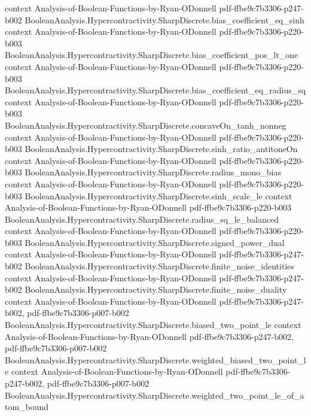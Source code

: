 \begin{theorem}
  {context}
  {Analysis-of-Boolean-Functions-by-Ryan-ODonnell}
  {pdf-ffbe9c7b3306-p247-b002}
\proofstep
  {BooleanAnalysis.Hypercontractivity.SharpDiscrete.bias_coefficient_eq_sinh}
  {context}
  {Analysis-of-Boolean-Functions-by-Ryan-ODonnell}
  {pdf-ffbe9c7b3306-p220-b003}
\proofstep
  {BooleanAnalysis.Hypercontractivity.SharpDiscrete.bias_coefficient_pos_lt_one}
  {context}
  {Analysis-of-Boolean-Functions-by-Ryan-ODonnell}
  {pdf-ffbe9c7b3306-p220-b003}
\proofstep
  {BooleanAnalysis.Hypercontractivity.SharpDiscrete.bias_coefficient_eq_radius_sq}
  {context}
  {Analysis-of-Boolean-Functions-by-Ryan-ODonnell}
  {pdf-ffbe9c7b3306-p220-b003}
\proofstep
  {BooleanAnalysis.Hypercontractivity.SharpDiscrete.concaveOn_tanh_nonneg}
  {context}
  {Analysis-of-Boolean-Functions-by-Ryan-ODonnell}
  {pdf-ffbe9c7b3306-p220-b003}
\proofstep
  {BooleanAnalysis.Hypercontractivity.SharpDiscrete.sinh_ratio_antitoneOn}
  {context}
  {Analysis-of-Boolean-Functions-by-Ryan-ODonnell}
  {pdf-ffbe9c7b3306-p220-b003}
\proofstep
  {BooleanAnalysis.Hypercontractivity.SharpDiscrete.radius_mono_bias}
  {context}
  {Analysis-of-Boolean-Functions-by-Ryan-ODonnell}
  {pdf-ffbe9c7b3306-p220-b003}
\proofstep
  {BooleanAnalysis.Hypercontractivity.SharpDiscrete.sinh_scale_le}
  {context}
  {Analysis-of-Boolean-Functions-by-Ryan-ODonnell}
  {pdf-ffbe9c7b3306-p220-b003}
\proofstep
  {BooleanAnalysis.Hypercontractivity.SharpDiscrete.radius_sq_le_balanced}
  {context}
  {Analysis-of-Boolean-Functions-by-Ryan-ODonnell}
  {pdf-ffbe9c7b3306-p220-b003}
\proofstep
  {BooleanAnalysis.Hypercontractivity.SharpDiscrete.signed_power_dual}
  {context}
  {Analysis-of-Boolean-Functions-by-Ryan-ODonnell}
  {pdf-ffbe9c7b3306-p247-b002}
\proofstep
  {BooleanAnalysis.Hypercontractivity.SharpDiscrete.finite_noise_identities}
  {context}
  {Analysis-of-Boolean-Functions-by-Ryan-ODonnell}
  {pdf-ffbe9c7b3306-p247-b002}
\proofstep
  {BooleanAnalysis.Hypercontractivity.SharpDiscrete.finite_noise_duality}
  {context}
  {Analysis-of-Boolean-Functions-by-Ryan-ODonnell}
  {pdf-ffbe9c7b3306-p247-b002,
    pdf-ffbe9c7b3306-p007-b002}
\proofstep
  {BooleanAnalysis.Hypercontractivity.SharpDiscrete.biased_two_point_le}
  {context}
  {Analysis-of-Boolean-Functions-by-Ryan-ODonnell}
  {pdf-ffbe9c7b3306-p247-b002,
    pdf-ffbe9c7b3306-p007-b002}
\proofstep
  {BooleanAnalysis.Hypercontractivity.SharpDiscrete.weighted_biased_two_point_le}
  {context}
  {Analysis-of-Boolean-Functions-by-Ryan-ODonnell}
  {pdf-ffbe9c7b3306-p247-b002,
    pdf-ffbe9c7b3306-p007-b002}
\proofstep
  {BooleanAnalysis.Hypercontractivity.SharpDiscrete.weighted_two_point_le_of_atom_bound}

\end{theorem}
